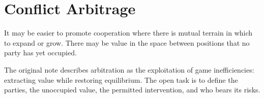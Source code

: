 \chapter{Conflict Arbitrage}
\label{chap:conflict-arbitrage}


It may be easier to promote cooperation where there is mutual terrain in which
to expand or grow. There may be value in the space between positions that no
party has yet occupied.

The original note describes arbitration as the exploitation of game
inefficiencies: extracting value while restoring equilibrium. The open task is
to define the parties, the unoccupied value, the permitted intervention, and
who bears its risks.
